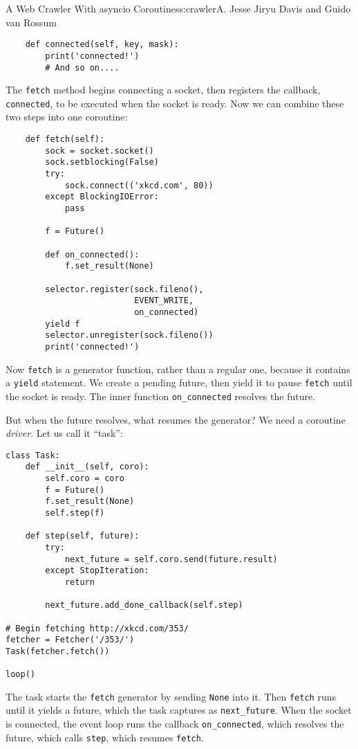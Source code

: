 \begin{aosachapter}{A Web Crawler With asyncio Coroutines}{s:crawler}{A. Jesse Jiryu Davis and Guido van Rossum}
\begin{verbatim}
    def connected(self, key, mask):
        print('connected!')
        # And so on....
\end{verbatim}

The \texttt{fetch} method begins connecting a socket, then registers the
callback, \texttt{connected}, to be executed when the socket is ready.
Now we can combine these two steps into one coroutine:

\begin{verbatim}
    def fetch(self):
        sock = socket.socket()
        sock.setblocking(False)
        try:
            sock.connect(('xkcd.com', 80))
        except BlockingIOError:
            pass

        f = Future()

        def on_connected():
            f.set_result(None)

        selector.register(sock.fileno(),
                          EVENT_WRITE,
                          on_connected)
        yield f
        selector.unregister(sock.fileno())
        print('connected!')
\end{verbatim}

Now \texttt{fetch} is a generator function, rather than a regular one,
because it contains a \texttt{yield} statement. We create a pending
future, then yield it to pause \texttt{fetch} until the socket is ready.
The inner function \texttt{on\_connected} resolves the future.

But when the future resolves, what resumes the generator? We need a
coroutine \emph{driver}. Let us call it ``task'':

\begin{verbatim}
class Task:
    def __init__(self, coro):
        self.coro = coro
        f = Future()
        f.set_result(None)
        self.step(f)

    def step(self, future):
        try:
            next_future = self.coro.send(future.result)
        except StopIteration:
            return

        next_future.add_done_callback(self.step)

# Begin fetching http://xkcd.com/353/
fetcher = Fetcher('/353/')
Task(fetcher.fetch())

loop()
\end{verbatim}

The task starts the \texttt{fetch} generator by sending \texttt{None}
into it. Then \texttt{fetch} runs until it yields a future, which the
task captures as \texttt{next\_future}. When the socket is connected,
the event loop runs the callback \texttt{on\_connected}, which resolves
the future, which calls \texttt{step}, which resumes \texttt{fetch}.


\end{aosachapter}
